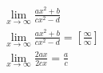 \begin{ex}
\begin{align}
&\lim_{x\rightarrow \infty} \frac{ax^2+b}{cx^2-d}\nonumber\\
&\lim_{x\rightarrow \infty} \frac{ax^2+b}{cx^2-d}=\left[\frac{\infty}{\infty}\right]\nonumber\\
&\lim_{x\rightarrow \infty} \frac{2ax}{2cx}=\frac{a}{c}\nonumber
\end{align}
\end{ex}